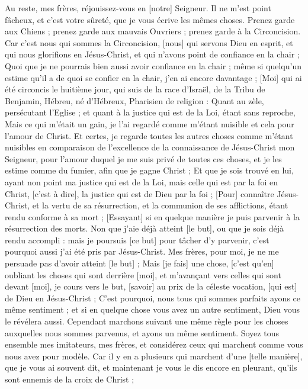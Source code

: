\begin{multicols}{2}
\VerseOne{}Au reste, mes frères, réjouissez-vous en [notre] Seigneur. Il ne m'est point fâcheux, et c'est votre sûreté, que je vous écrive les mêmes choses.
Prenez garde aux Chiens ; prenez garde aux mauvais Ouvriers ; prenez garde à la Circoncision.
Car c'est nous qui sommes la Circoncision, [nous] qui servons Dieu en esprit, et qui nous glorifions en Jésus-Christ, et qui n'avons point de confiance en la chair ;
Quoi que je ne pourrais bien aussi avoir confiance en la chair ; même si quelqu'un estime qu'il a de quoi se confier en la chair, j'en ai encore davantage ;
[Moi] qui ai été circoncis le huitième jour, qui suis de la race d'Israël, de la Tribu de Benjamin, Hébreu, né d'Hébreux, Pharisien de religion :
Quant au zèle, persécutant l'Eglise ; et quant à la justice qui est de la Loi, étant sans reproche,
Mais ce qui m'était un gain, je l'ai regardé comme m'étant nuisible et cela pour l'amour de Christ.
Et certes, je regarde toutes les autres choses comme m'étant nuisibles en comparaison de l'excellence de la connaissance de Jésus-Christ mon Seigneur, pour l'amour duquel je me suis privé de toutes ces choses, et je les estime comme du fumier, afin que je gagne Christ ;
Et que je sois trouvé en lui, ayant non point ma justice qui est de la Loi, mais celle qui est par la foi en Christ, [c'est à dire], la justice qui est de Dieu par la foi ;
[Pour] connaître Jésus-Christ, et la vertu de sa résurrection, et la communion de ses afflictions, étant rendu conforme à sa mort ;
[Essayant] si en quelque manière je puis parvenir à la résurrection des morts.
Non que j'aie déjà atteint [le but], ou que je sois déjà rendu accompli : mais je poursuis [ce but] pour tâcher d'y parvenir, c'est pourquoi aussi j'ai été pris par Jésus-Christ.
Mes frères, pour moi, je ne me persuade pas d'avoir atteint [le but] ;
Mais [je fais] une chose, [c'est qu'en] oubliant les choses qui sont derrière [moi], et m'avançant vers celles qui sont devant [moi], je cours vers le but, [savoir] au prix de la céleste vocation, [qui est] de Dieu en Jésus-Christ ;
C'est pourquoi, nous tous qui sommes parfaits ayons ce même sentiment ; et si en quelque chose vous avez un autre sentiment, Dieu vous le révélera aussi.
Cependant marchons suivant une même règle pour les choses auxquelles nous sommes parvenus, et ayons un même sentiment.
Soyez tous ensemble mes imitateurs, mes frères, et considérez ceux qui marchent comme vous nous avez pour modèle.
Car il y en a plusieurs qui marchent d'une [telle manière], que je vous ai souvent dit, et maintenant je vous le dis encore en pleurant, qu'ils sont ennemis de la croix de Christ ;

\end{multicols}
